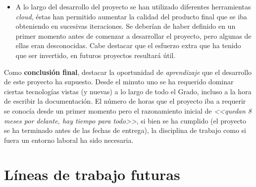 \begin{itemize}
\item A lo largo del desarrollo del proyecto se han utilizado diferentes herramientas \emph{cloud}, éstas han permitido aumentar la calidad del producto final que se iba obteniendo en sucesivas iteraciones. Se deberían de haber definido en un primer momento antes de comenzar a desarrollar el proyecto, pero algunas de ellas eran desconocidas. Cabe destacar que el esfuerzo extra que ha tenido que ser invertido, en futuros proyectos resultará útil.
\end{itemize}

Como \textbf{conclusión final}, destacar la oportunidad de \emph{aprendizaje} que el desarrollo de este proyecto ha supuesto. Desde el minuto uno se ha requerido dominar ciertas tecnologías vistas (y nuevas) a lo largo de todo el Grado, incluso a la hora de escribir la documentación. El número de horas que el proyecto iba a requerir se conocía desde un primer momento pero el razonamiento inicial de \emph{<<quedan 8 meses por delante, hay tiempo para todo>>}, si bien se ha cumplido (el proyecto se ha terminado antes de las fechas de entrega), la disciplina de trabajo como si fuera un entorno laboral ha sido necesaria.

\section{Líneas de trabajo futuras}


